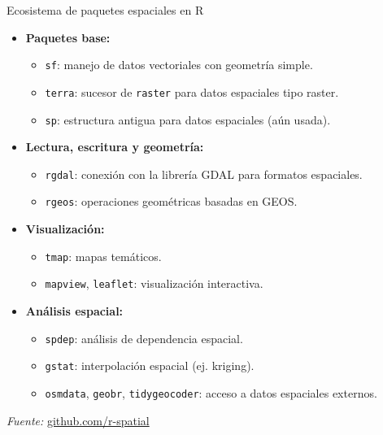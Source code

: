 \documentclass{beamer}
\begin{document}
\begin{frame}{Ecosistema de paquetes espaciales en R}
\small
\begin{itemize}
    \item \textbf{Paquetes base:}
    \begin{itemize}
        \item \texttt{sf}: manejo de datos vectoriales con geometría simple.
        \item \texttt{terra}: sucesor de \texttt{raster} para datos espaciales tipo raster.
        \item \texttt{sp}: estructura antigua para datos espaciales (aún usada).
    \end{itemize}
    \item \textbf{Lectura, escritura y geometría:}
    \begin{itemize}
        \item \texttt{rgdal}: conexión con la librería GDAL para formatos espaciales.
        \item \texttt{rgeos}: operaciones geométricas basadas en GEOS.
    \end{itemize}
    \item \textbf{Visualización:}
    \begin{itemize}
        \item \texttt{tmap}: mapas temáticos.
        \item \texttt{mapview}, \texttt{leaflet}: visualización interactiva.
    \end{itemize}
    \item \textbf{Análisis espacial:}
    \begin{itemize}
        \item \texttt{spdep}: análisis de dependencia espacial.
        \item \texttt{gstat}: interpolación espacial (ej. kriging).
        \item \texttt{osmdata}, \texttt{geobr}, \texttt{tidygeocoder}: acceso a datos espaciales externos.
    \end{itemize}
\end{itemize}
\scriptsize
\textit{Fuente:} \href{https://github.com/r-spatial}{github.com/r-spatial}
\end{frame}
\end{document}
